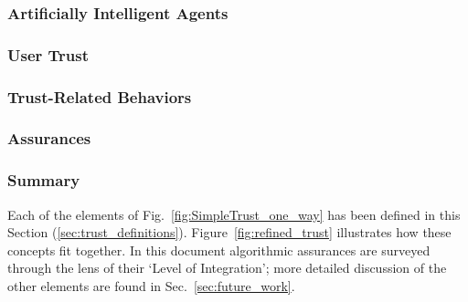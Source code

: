 \subsubsection*{Artificially Intelligent Agents} %

\subsubsection*{User Trust} %

\subsubsection*{Trust-Related Behaviors} %

\subsubsection*{Assurances} \label{sec:assurances}


\subsubsection*{Summary}
Each of the elements of Fig.~\ref{fig:SimpleTrust_one_way} has been defined in this Section (\ref{sec:trust_definitions}). Figure~\ref{fig:refined_trust} illustrates how these concepts fit together. In this document algorithmic assurances are surveyed through the lens of their `Level of Integration'; more detailed discussion of the other elements are found in Sec.~\ref{sec:future_work}.
